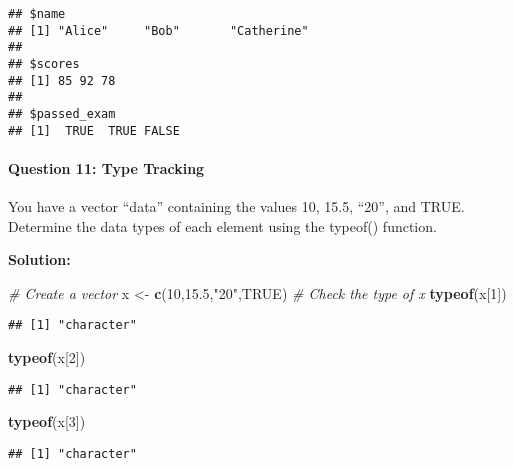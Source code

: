 \documentclass[
]{article}
\newenvironment{Shaded}{\begin{snugshade}}{\end{snugshade}}
\newcommand{\CommentTok}[1]{\textcolor[rgb]{0.56,0.35,0.01}{\textit{#1}}}
\newcommand{\ConstantTok}[1]{\textcolor[rgb]{0.56,0.35,0.01}{#1}}
\newcommand{\DecValTok}[1]{\textcolor[rgb]{0.00,0.00,0.81}{#1}}
\newcommand{\FloatTok}[1]{\textcolor[rgb]{0.00,0.00,0.81}{#1}}
\newcommand{\FunctionTok}[1]{\textcolor[rgb]{0.13,0.29,0.53}{\textbf{#1}}}
\newcommand{\NormalTok}[1]{#1}
\newcommand{\OtherTok}[1]{\textcolor[rgb]{0.56,0.35,0.01}{#1}}
\newcommand{\StringTok}[1]{\textcolor[rgb]{0.31,0.60,0.02}{#1}}
\begin{document}
\begin{verbatim}
## $name
## [1] "Alice"     "Bob"       "Catherine"
## 
## $scores
## [1] 85 92 78
## 
## $passed_exam
## [1]  TRUE  TRUE FALSE
\end{verbatim}

\hypertarget{question-11-type-tracking}{%
\paragraph{Question 11: Type Tracking}\label{question-11-type-tracking}}

You have a vector ``data'' containing the values 10, 15.5, ``20'', and
TRUE. Determine the data types of each element using the typeof()
function.

\textbf{Solution:}

\begin{Shaded}
\begin{Highlighting}[]
\CommentTok{\# Create a vector}
\NormalTok{x }\OtherTok{\textless{}{-}} \FunctionTok{c}\NormalTok{(}\DecValTok{10}\NormalTok{,}\FloatTok{15.5}\NormalTok{,}\StringTok{"20"}\NormalTok{,}\ConstantTok{TRUE}\NormalTok{)}
\CommentTok{\# Check the type of x}
\FunctionTok{typeof}\NormalTok{(x[}\DecValTok{1}\NormalTok{])}
\end{Highlighting}
\end{Shaded}

\begin{verbatim}
## [1] "character"
\end{verbatim}

\begin{Shaded}
\begin{Highlighting}[]
\FunctionTok{typeof}\NormalTok{(x[}\DecValTok{2}\NormalTok{])}
\end{Highlighting}
\end{Shaded}

\begin{verbatim}
## [1] "character"
\end{verbatim}

\begin{Shaded}
\begin{Highlighting}[]
\FunctionTok{typeof}\NormalTok{(x[}\DecValTok{3}\NormalTok{])}
\end{Highlighting}
\end{Shaded}

\begin{verbatim}
## [1] "character"
\end{verbatim}
\end{document}
